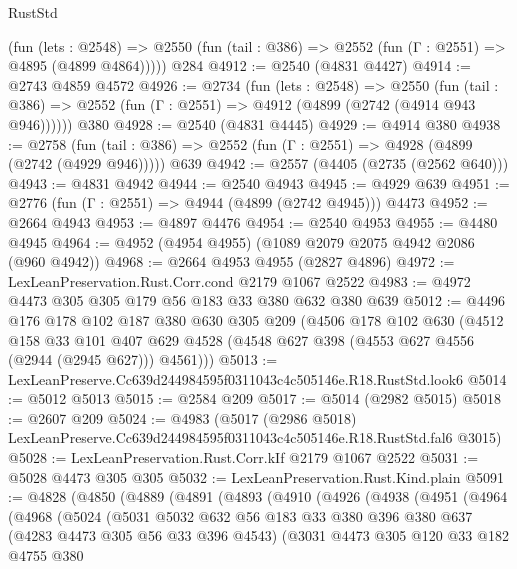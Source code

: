 \begin{lexlean}{RustStd}
\begin{coremodule}
      (fun (lets : @2548) =>
      @2550 (fun (tail : @386) => @2552 (fun (Γ : @2551) => @4895 (@4899 @4864)))))
    @284
@4912 := @2540 (@4831 @4427)
@4914 := @2743 @4859 @4572
@4926 := @2734
    (fun (lets : @2548) =>
    @2550 (fun (tail : @386) => @2552 (fun (Γ : @2551) => @4912 (@4899 (@2742 (@4914 @943 @946))))))
    @380
@4928 := @2540 (@4831 @4445)
@4929 := @4914 @380
@4938 := @2758
    (fun (tail : @386) => @2552 (fun (Γ : @2551) => @4928 (@4899 (@2742 (@4929 @946)))))
    @639
@4942 := @2557 (@4405 (@2735 (@2562 @640)))
@4943 := @4831 @4942
@4944 := @2540 @4943
@4945 := @4929 @639
@4951 := @2776 (fun (Γ : @2551) => @4944 (@4899 (@2742 @4945))) @4473
@4952 := @2664 @4943
@4953 := @4897 @4476
@4954 := @2540 @4953
@4955 := @4480 @4945
@4964 := @4952 (@4954 @4955) (@1089 @2079 @2075 @4942 @2086 (@960 @4942))
@4968 := @2664 @4953 @4955 (@2827 @4896)
@4972 := LexLeanPreservation.Rust.Corr.cond @2179 @1067 @2522
@4983 := @4972 @4473 @305 @305 @179 @56 @183 @33 @380 @632 @380 @639
@5012 := @4496
    @176
    @178
    @102
    @187
    @380
    @630
    @305
    @209
    (@4506
      @178
      @102
      @630
      (@4512
        @158
        @33
        @101
        @407
        @629
        @4528
        (@4548 @627 @398 (@4553 @627 @4556 (@2944 (@2945 @627))) @4561)))
@5013 := LexLeanPreserve.Cc639d244984595f0311043c4c505146e.R18.RustStd.look6
@5014 := @5012 @5013
@5015 := @2584 @209
@5017 := @5014 (@2982 @5015)
@5018 := @2607 @209
@5024 := @4983
    (@5017 (@2986 @5018) LexLeanPreserve.Cc639d244984595f0311043c4c505146e.R18.RustStd.fal6 @3015)
@5028 := LexLeanPreservation.Rust.Corr.kIf @2179 @1067 @2522
@5031 := @5028 @4473 @305 @305
@5032 := LexLeanPreservation.Rust.Kind.plain
@5091 := @4828
    (@4850
      (@4889
        (@4891
          (@4893
            (@4910
              (@4926
                (@4938
                  (@4951
                    (@4964
                      (@4968
                        (@5024
                          (@5031
                            @5032
                            @632
                            @56
                            @183
                            @33
                            @380
                            @396
                            @380
                            @637
                            (@4283 @4473 @305 @56 @33 @396 @4543)
                            (@3031
                              @4473
                              @305
                              @120
                              @33
                              @182
                              @4755
                              @380

\end{coremodule}
\end{lexlean}
